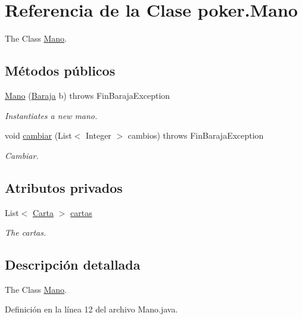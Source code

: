 \hypertarget{classpoker_1_1Mano}{}\section{Referencia de la Clase poker.\+Mano}
\label{classpoker_1_1Mano}


The Class \mbox{\hyperlink{classpoker_1_1Mano}{Mano}}.  


\subsection*{Métodos públicos}
\begin{DoxyCompactItemize}
\item 
\mbox{\hyperlink{classpoker_1_1Mano_ac89468d484812da476c2a46201eb513e}{Mano}} (\mbox{\hyperlink{classpoker_1_1Baraja}{Baraja}} b)  throws Fin\+Baraja\+Exception 
\begin{DoxyCompactList}\small\item\em Instantiates a new mano. \end{DoxyCompactList}\item 
void \mbox{\hyperlink{classpoker_1_1Mano_a1f3e7289b85d98324d46a8afce171368}{cambiar}} (List$<$ Integer $>$ cambios)  throws Fin\+Baraja\+Exception 
\begin{DoxyCompactList}\small\item\em Cambiar. \end{DoxyCompactList}\end{DoxyCompactItemize}
\subsection*{Atributos privados}
\begin{DoxyCompactItemize}
\item 
List$<$ \mbox{\hyperlink{classpoker_1_1Carta}{Carta}} $>$ \mbox{\hyperlink{classpoker_1_1Mano_ae6e107ad79d163a4c45afc6274d36d9e}{cartas}}
\begin{DoxyCompactList}\small\item\em The cartas. \end{DoxyCompactList}\end{DoxyCompactItemize}


\subsection{Descripción detallada}
The Class \mbox{\hyperlink{classpoker_1_1Mano}{Mano}}. 

Definición en la línea 12 del archivo Mano.\+java.



